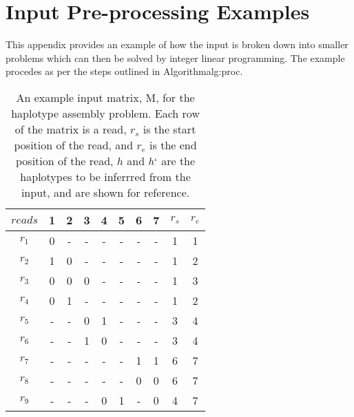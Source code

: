 \documentclass[10pt,a4paer,twocolumn]{article}
\begin{document}



\clearpage 

\appendix

\section{Input Pre-processing Examples } \label{app:inpre}

This appendix provides an example of how the input is broken down into smaller problems which can then be 
solved by integer linear programming. The example procedes as per the steps outlined in Algorithm{alg:proc}.

\begin{table}[h!]
\centering
\caption{An example input matrix, M, for the haplotype assembly problem. Each row of the matrix is a read, 
        $r_s$ is the start position of the read, and $r_e$ is the end position of the read, $h$ and $h`$ are
        the haplotypes to be inferrred from the input, and are shown for reference.}
\label{tab:exinp}   
\begin{tabular}{c c c c c c c c c c}
    \hline 
    $reads$     & 1     & 2     & 3     & 4     & 5     & 6     & 7     & $r_s$     & $r_e$         \\
    \hline
    $r_1$       & 0     & -     & -     & -     & -     & -     & -     & 1         & 1             \\
    $r_2$       & 1     & 0     & -     & -     & -     & -     & -     & 1         & 2             \\
    $r_3$       & 0     & 0     & 0     & -     & -     & -     & -     & 1         & 3             \\
    $r_4$       & 0     & 1     & -     & -     & -     & -     & -     & 1         & 2             \\
    $r_5$       & -     & -     & 0     & 1     & -     & -     & -     & 3         & 4             \\
    $r_6$       & -     & -     & 1     & 0     & -     & -     & -     & 3         & 4             \\
    $r_7$       & -     & -     & -     & -     & -     & 1     & 1     & 6         & 7             \\
    $r_8$       & -     & -     & -     & -     & -     & 0     & 0     & 6         & 7             \\
    $r_9$       & -     & -     & -     & 0     & 1     & -     & 0     & 4         & 7             \\

\end{tabular}
\end{table}
\end{document}
